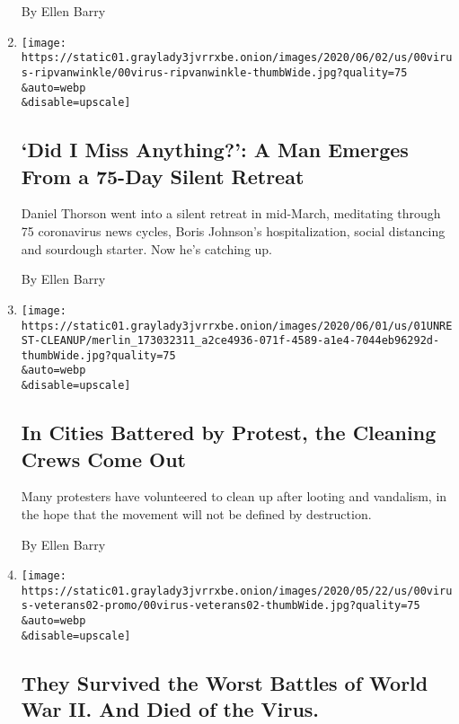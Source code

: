 \begin{enumerate}
  By Ellen Barry
\item
  \href{/2020/06/02/us/coronavirus-meditation.html}{}

  \texttt{[image: https://static01.graylady3jvrrxbe.onion/images/2020/06/02/us/00virus-ripvanwinkle/00virus-ripvanwinkle-thumbWide.jpg?quality=75\\\&auto=webp\\\&disable=upscale]}

  \hypertarget{did-i-miss-anything-a-man-emerges-from-a-75-day-silent-retreat}{%
  \subsection{`Did I Miss Anything?': A Man Emerges From a 75-Day Silent
  Retreat}\label{did-i-miss-anything-a-man-emerges-from-a-75-day-silent-retreat}}

  Daniel Thorson went into a silent retreat in mid-March, meditating
  through 75 coronavirus news cycles, Boris Johnson's hospitalization,
  social distancing and sourdough starter. Now he's catching up.

  By Ellen Barry
\item
  \href{/2020/06/01/us/george-floyd-protests-cleanup.html}{}

  \texttt{[image: https://static01.graylady3jvrrxbe.onion/images/2020/06/01/us/01UNREST-CLEANUP/merlin\_173032311\_a2ce4936-071f-4589-a1e4-7044eb96292d-thumbWide.jpg?quality=75\\\&auto=webp\\\&disable=upscale]}

  \hypertarget{in-cities-battered-by-protest-the-cleaning-crews-come-out}{%
  \subsection{In Cities Battered by Protest, the Cleaning Crews Come
  Out}\label{in-cities-battered-by-protest-the-cleaning-crews-come-out}}

  Many protesters have volunteered to clean up after looting and
  vandalism, in the hope that the movement will not be defined by
  destruction.

  By Ellen Barry
\item
  \href{/2020/05/24/us/they-survived-the-worst-battles-of-world-war-ii-and-died-of-the-virus.html}{}

  \texttt{[image: https://static01.graylady3jvrrxbe.onion/images/2020/05/22/us/00virus-veterans02-promo/00virus-veterans02-thumbWide.jpg?quality=75\\\&auto=webp\\\&disable=upscale]}

  \hypertarget{they-survived-the-worst-battles-of-world-war-ii-and-died-of-the-virus}{%
  \subsection{They Survived the Worst Battles of World War II. And Died
  of the
  Virus.}\label{they-survived-the-worst-battles-of-world-war-ii-and-died-of-the-virus}}


\end{enumerate}
